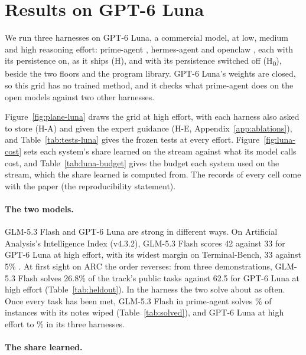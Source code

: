 \FloatBarrier  %
\section{Results on GPT-6 Luna}
\label{app:results}

We run three harnesses on GPT-6 Luna, a commercial model, at low, medium and high reasoning effort: prime-agent \citep{karten2026primeagent}, hermes-agent \citep{nous2026hermesagent} and openclaw \citep{openclaw2026}, each with its persistence on, as it ships (H), and with its persistence switched off (H\textsubscript{0}), beside the two floors and the program library. GPT-6 Luna's weights are closed, so this grid has no trained method, and it checks what prime-agent does on the open models against two other harnesses.

Figure~\ref{fig:plane-luna} draws the grid at high effort, with each harness also asked to store (H-A) and given the expert guidance (H-E, Appendix~\ref{app:ablations}), and Table~\ref{tab:tests-luna} gives the frozen tests at every effort. Figure~\ref{fig:luna-cost} sets each system's share learned on the stream against what its model calls cost, and Table~\ref{tab:luna-budget} gives the budget each system used on the stream, which the share learned is computed from. The records of every cell come with the paper (the reproducibility statement).

\paragraph{The two models.}
GLM-5.3 Flash and GPT-6 Luna are strong in different ways. On Artificial Analysis's Intelligence Index (v4.3.2), GLM-5.3 Flash scores 42 against 33 for GPT-6 Luna at high effort, with its widest margin on Terminal-Bench, 33 against 5\% \citep{artificialanalysis2026index}. At first sight on ARC the order reverses: from three demonstrations, GLM-5.3 Flash solves 26.8\% of the track's public tasks against 62.5 for GPT-6 Luna at high effort (Table~\ref{tab:heldout}). In the harness the two solve about as often. Once every task has been met, GLM-5.3 Flash in prime-agent solves \sbGlmHzeroSolved{}\% of instances with its notes wiped (Table~\ref{tab:solved}), and GPT-6 Luna at high effort \sbLunaHzeroSolvedMin{} to \sbLunaHzeroSolvedMax{}\% in its three harnesses.

\paragraph{The share learned.}
\label{sec:luna}


